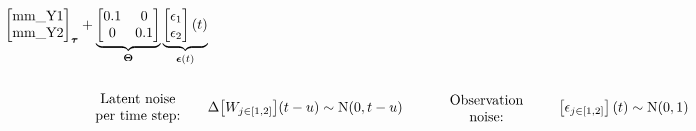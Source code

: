 \documentclass[a4paper]{article}
\newcommand{\vect}[1]{\boldsymbol{\mathbf{#1}}}
\begin{document}
\begin{normalsize}
\begin{align*}
{\begin{bmatrix}
    	\text{mm\_Y1}\\ 
    	\text{mm\_Y2}
    	\end{bmatrix} 
    }_{{\vect{\tau}}} + 
    \underbrace{
    	\begin{bmatrix}
    	0.1 & 0\\ 
    	0 & 0.1
    	\end{bmatrix}  
    }_{{\vect{\Theta}}}
    \underbrace{
    	\begin{bmatrix}
    	\epsilon_{1}\\ 
    	\epsilon_{2}
    	\end{bmatrix} 
    	(t)}_{\vect{\epsilon}(t)} \\ \\
                \parbox{10em}{\centering{Latent noise\linebreak per time step:}}
          &\Delta \big[W_{j \in [1,2]}\big](t-u)   \sim  \mathrm{N}(0,t-u) \quad
              \parbox{10em}{\centering{Observation\linebreak noise:}}
            \begin{bmatrix}
\epsilon_{j \in [1,2]}
\end{bmatrix} 
            (t) \sim  \mathrm{N}(0,1) \\ \\
      \end{align*}
      \end{normalsize}
      
\end{document}
